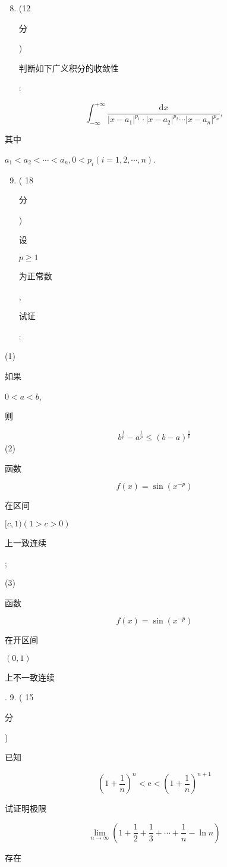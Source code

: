 \documentclass[10pt]{article}
\begin{document}
\begin{enumerate}
  \setcounter{enumi}{7}
  \item (12 \begin{CJK}{UTF8}{mj}分\end{CJK}) \begin{CJK}{UTF8}{mj}判断如下广义积分的收敛性\end{CJK}:
\end{enumerate}
$$
\int_{-\infty}^{+\infty} \frac{\mathrm{d} x}{\left|x-a_{1}\right|^{p_{1}} \cdot\left|x-a_{2}\right|^{p_{2}} \cdots\left|x-a_{n}\right|^{p_{n}}},
$$
\begin{CJK}{UTF8}{mj}其中\end{CJK} $a_{1}<a_{2}<\cdots<a_{n}, 0<p_{i}(i=1,2, \cdots, n)$.

\begin{enumerate}
  \setcounter{enumi}{8}
  \item ( 18 \begin{CJK}{UTF8}{mj}分\end{CJK}) \begin{CJK}{UTF8}{mj}设\end{CJK} $p \geq 1$ \begin{CJK}{UTF8}{mj}为正常数\end{CJK}, \begin{CJK}{UTF8}{mj}试证\end{CJK}:
\end{enumerate}
(1) \begin{CJK}{UTF8}{mj}如果\end{CJK} $0<a<b$, \begin{CJK}{UTF8}{mj}则\end{CJK}
$$
b^{\frac{1}{p}}-a^{\frac{1}{p}} \leq(b-a)^{\frac{1}{p}}
$$
(2) \begin{CJK}{UTF8}{mj}函数\end{CJK}
$$
f(x)=\sin \left(x^{-p}\right)
$$
\begin{CJK}{UTF8}{mj}在区间\end{CJK} $[c, 1)(1>c>0)$ \begin{CJK}{UTF8}{mj}上一致连续\end{CJK};

(3) \begin{CJK}{UTF8}{mj}函数\end{CJK}
$$
f(x)=\sin \left(x^{-p}\right)
$$
\begin{CJK}{UTF8}{mj}在开区间\end{CJK} $(0,1)$ \begin{CJK}{UTF8}{mj}上不一致连续\end{CJK}. 9. ( 15 \begin{CJK}{UTF8}{mj}分\end{CJK}) \begin{CJK}{UTF8}{mj}已知\end{CJK}
$$
\left(1+\frac{1}{n}\right)^{n}<\mathrm{e}<\left(1+\frac{1}{n}\right)^{n+1}
$$
\begin{CJK}{UTF8}{mj}试证明极限\end{CJK}
$$
\lim _{n \rightarrow \infty}\left(1+\frac{1}{2}+\frac{1}{3}+\cdots+\frac{1}{n}-\ln n\right)
$$
\begin{CJK}{UTF8}{mj}存在\end{CJK}
\end{document}
